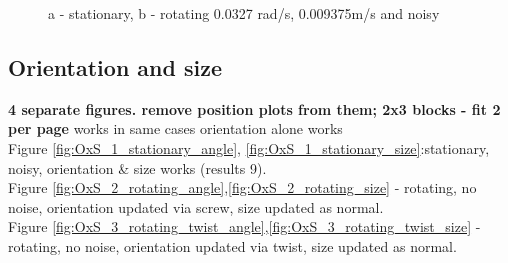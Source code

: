 \begin{figure}
\centering
 	\caption{a - stationary, b - rotating 0.0327 rad/s, 0.009375m/s and noisy}
 	\label{fig:size_update}
\end{figure}

\subsection{Orientation and size}
\textbf{4 separate figures. remove position plots from them; 2x3 blocks - fit 2 per page}
works in same cases orientation alone works\\
Figure \ref{fig:OxS_1_stationary_angle}, \ref{fig:OxS_1_stationary_size}:stationary, noisy, orientation \& size works (results 9).\\
Figure \ref{fig:OxS_2_rotating_angle},\ref{fig:OxS_2_rotating_size} - rotating, no noise, orientation updated via screw, size updated as normal. \\ 
Figure \ref{fig:OxS_3_rotating_twist_angle},\ref{fig:OxS_3_rotating_twist_size} - rotating, no noise, orientation updated via twist, size updated as normal.

